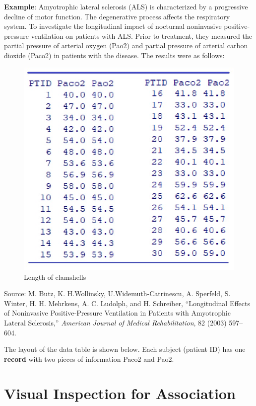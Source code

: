 \documentclass[
]{book}
\begin{document}
\textbf{Example}: Amyotrophic lateral sclerosis (ALS) is characterized by a progressive decline of motor function. The degenerative process affects the respiratory system. To investigate the longitudinal impact of nocturnal noninvasive positive-pressure ventilation on patients with ALS. Prior to treatment, they measured the partial pressure of arterial oxygen (Pao2) and partial pressure of arterial carbon dioxide (Paco2) in patients with the disease. The results were as follows:

\begin{figure}

{\centering \includegraphics[width=0.8\linewidth]{img09/w09-als} 

}

\caption{ Length of clamshells}\label{fig:unnamed-chunk-137}
\end{figure}

Source: M. Butz, K. H.Wollinsky, U.Widemuth-Catrinescu, A. Sperfeld, S. Winter, H. H. Mehrkens, A. C. Ludolph, and H. Schreiber, ``Longitudinal Effects of Noninvasive Positive-Pressure Ventilation in Patients with Amyotrophic Lateral Sclerosis,'' \emph{American Journal of Medical Rehabilitation}, 82 (2003) 597--604.

The layout of the data table is shown below. Each subject (patient ID) has one \textbf{record} with two pieces of information Paco2 and Pao2.

\hypertarget{visual-inspection-for-association}{%
\section{Visual Inspection for Association}\label{visual-inspection-for-association}}
\end{document}
